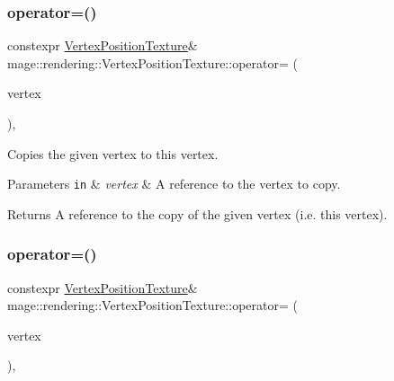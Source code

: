 \subsubsection{\texorpdfstring{operator=()}{operator=()}\hspace{0.1cm}{\footnotesize\ttfamily [1/2]}}
{\footnotesize\ttfamily constexpr \hyperlink{structmage_1_1rendering_1_1_vertex_position_texture}{Vertex\+Position\+Texture}\& mage\+::rendering\+::\+Vertex\+Position\+Texture\+::operator= (\begin{DoxyParamCaption}\item[{const \hyperlink{structmage_1_1rendering_1_1_vertex_position_texture}{Vertex\+Position\+Texture} \&}]{vertex }\end{DoxyParamCaption})\hspace{0.3cm}{\ttfamily [default]}, {\ttfamily [noexcept]}}

Copies the given vertex to this vertex.


\begin{DoxyParams}[1]{Parameters}
\mbox{\tt in}  & {\em vertex} & A reference to the vertex to copy. \\
\hline
\end{DoxyParams}
\begin{DoxyReturn}{Returns}
A reference to the copy of the given vertex (i.\+e. this vertex). 
\end{DoxyReturn}
\hypertarget{structmage_1_1rendering_1_1_vertex_position_texture_a6bf7ada3b933e5790349225ee323db36}{}\label{structmage_1_1rendering_1_1_vertex_position_texture_a6bf7ada3b933e5790349225ee323db36} 
\subsubsection{\texorpdfstring{operator=()}{operator=()}\hspace{0.1cm}{\footnotesize\ttfamily [2/2]}}
{\footnotesize\ttfamily constexpr \hyperlink{structmage_1_1rendering_1_1_vertex_position_texture}{Vertex\+Position\+Texture}\& mage\+::rendering\+::\+Vertex\+Position\+Texture\+::operator= (\begin{DoxyParamCaption}\item[{\hyperlink{structmage_1_1rendering_1_1_vertex_position_texture}{Vertex\+Position\+Texture} \&\&}]{vertex }\end{DoxyParamCaption})\hspace{0.3cm}{\ttfamily [default]}, {\ttfamily [noexcept]}}

